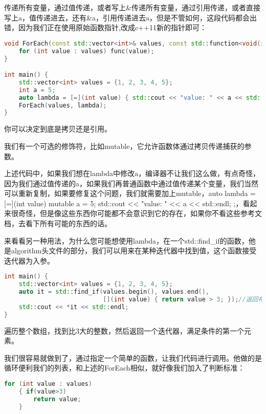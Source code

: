 传递所有变量，通过值传递，或者写上{\ncodestyle \&}传递所有变量，通过引用传递，或者直接写上{\ncodestyle a}，值传递进去，还有{\ncodestyle \&a}，引用传递进去{\ncodestyle a}，但是不管如何，这段代码都会出错，因为我们正在使用原始函数指针,改成c++11新的指针即可：

\begin{lstlisting}[language=c++]
void ForEach(const std::vector<int>& values, const std::function<void(int)>&func) {
    for (int value : values) func(value);
}

int main() {
    std::vector<int> values = {1, 2, 3, 4, 5};
    int a = 5;
    auto lambda = [=](int value) { std::cout << "value: " << a << std::endl; };
    ForEach(values, lambda);
}
\end{lstlisting}

你可以决定到底是拷贝还是引用。

我们有一个可选的修饰符，比如{\ncodestyle mutable}，它允许函数体通过拷贝传递捕获的参数。

上述代码中，如果我们想在lambda中修改{\ncodestyle a}，编译器不让我们这么做，有点奇怪，因为我们通过值传递的a，如果我们再普通函数中通过值传递某个变量，我们当然可以重新复制，如果要修复这个问题，我们就需要加上{\ncodestyle mutable}，{\ncodestyle auto lambda = [=](int value) mutable{ a = 5; std::cout << "value: " << a << std::endl; };}，看起来很奇怪，但是像这些东西你可能都不会意识到它的存在，如果你不看这些参考文档，去看下所有可能的东西的话。

来看看另一种用法，为什么您可能想使用lambda，在一个{\ncodestyle std::find_if}的函数，他是{\ncodestyle algorithm}头文件的部分，我们可以用来在某种迭代器中找到值，这个函数接受迭代器为入参。

\begin{lstlisting}[language=c++]
int main() {
    std::vector<int> values = {1, 2, 3, 4, 5};
    auto it = std::find_if(values.begin(), values.end(),
                           [](int value) { return value > 3; });//返回布尔值，也就是是否满足条件
    std::cout << *it << std::endl;
}
\end{lstlisting}

遍历整个数组，找到比3大的整数，然后返回一个迭代器，满足条件的第一个元素。

我们很容易就做到了，通过指定一个简单的函数，让我们代码进行调用。他做的是循环便利我们的列表，和上述的{\ncodestyle ForEach}相似，就好像我们加入了判断标准：

\begin{lstlisting}[language=c++]
    for (int value : values)
    { if(value>3)
        return value;
    }
\end{lstlisting}

